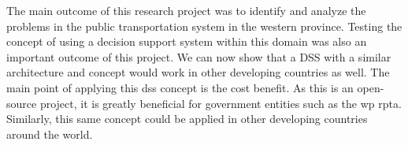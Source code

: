 The main outcome of this research project was to identify and analyze the problems in the public transportation system in the western province. Testing the concept of using a decision support system within this domain was also an important outcome of this project. We can now show that a DSS with a similar architecture and concept would work in other developing countries as well. The main point of applying this \acrshort{dss} concept is the cost benefit. As this is an open-source project, it is greatly beneficial for government entities such as the \acrshort{wp} \acrshort{rpta}. Similarly, this same concept could be applied in other developing countries around the world.